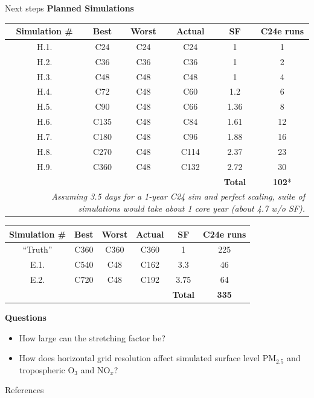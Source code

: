 \documentclass[10pt]{beamer}
\begin{document}
\begin{frame}{Next steps}
    \vspace{0.4cm}
    \footnotesize
    \textbf{Planned Simulations}
    \tiny
    \begin{table}[]
    \begin{tabular}{cccccc}
        \hline
        \textbf{Simulation \#} & \textbf{Best} & \textbf{Worst} &  \textbf{Actual} & \textbf{SF} & \textbf{C24e runs} \\ 
        \hline
        H.1. & C24 & C24 & C24 & 1 & 1  \\ 
        H.2. & C36 & C36 & C36 & 1 & 2  \\ 
        H.3. & C48 & C48 & C48 & 1 & 4  \\ 
        H.4. & C72 & C48 & C60 & 1.2 & 6  \\ 
        H.5. & C90 & C48 & C66 & 1.36 & 8  \\ 
        H.6. & C135 & C48 & C84 & 1.61 & 12  \\ 
        H.7. & C180 & C48 & C96 & 1.88 & 16  \\ 
        H.8. & C270 & C48 & C114 & 2.37 & 23  \\ 
        H.9. & C360 & C48 & C132 & 2.72 & 30  \\ 
        \hline
         &  &  & & \textbf{Total} & \textbf{102}*  \\ 
         \multicolumn{6}{r}{\fontsize{3}{3}\selectfont\textit{Assuming 3.5 days for a 1-year C24 sim and perfect scaling, suite of simulations would take about 1 core year (about 4.7 w/o SF).}} \\
    \end{tabular}
    \end{table}
    
    \tiny
    \begin{table}[]
    \begin{tabular}{cccccc}
        \hline
        \textbf{Simulation \#} & \textbf{Best} & \textbf{Worst} &  \textbf{Actual} & \textbf{SF} & \textbf{C24e runs} \\ 
        \hline
        ``Truth'' & C360 & C360 & C360 & 1 & 225  \\ 
        E.1. & C540 & C48 & C162 & 3.3 & 46  \\ 
        E.2. & C720 & C48 & C192 & 3.75 & 64  \\ 
        \hline
         &  &  & & \textbf{Total} & \textbf{335}  \\ 
    \end{tabular}
    \end{table}
    
    \footnotesize
    \textbf{Questions}
    \begin{itemize}
        \item How large can the stretching factor be?
        \item How does horizontal grid resolution affect simulated surface level PM$_{2.5}$ and tropospheric O$_3$ and NO$_x$?
    \end{itemize}
\end{frame}

\begin{frame}[allowframebreaks]{References}

  
  

\end{frame}
\end{document}
